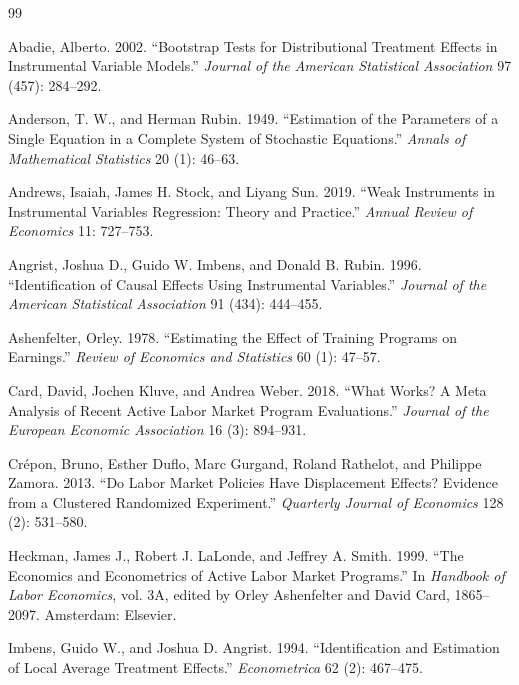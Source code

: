 \documentclass[12pt]{article}
\begin{document}
\begin{thebibliography}{99}

Abadie, Alberto. 2002. ``Bootstrap Tests for Distributional Treatment Effects in Instrumental Variable Models.'' \textit{Journal of the American Statistical Association} 97 (457): 284--292.

Anderson, T. W., and Herman Rubin. 1949. ``Estimation of the Parameters of a Single Equation in a Complete System of Stochastic Equations.'' \textit{Annals of Mathematical Statistics} 20 (1): 46--63.

Andrews, Isaiah, James H. Stock, and Liyang Sun. 2019. ``Weak Instruments in Instrumental Variables Regression: Theory and Practice.'' \textit{Annual Review of Economics} 11: 727--753.

Angrist, Joshua D., Guido W. Imbens, and Donald B. Rubin. 1996. ``Identification of Causal Effects Using Instrumental Variables.'' \textit{Journal of the American Statistical Association} 91 (434): 444--455.

Ashenfelter, Orley. 1978. ``Estimating the Effect of Training Programs on Earnings.'' \textit{Review of Economics and Statistics} 60 (1): 47--57.

Card, David, Jochen Kluve, and Andrea Weber. 2018. ``What Works? A Meta Analysis of Recent Active Labor Market Program Evaluations.'' \textit{Journal of the European Economic Association} 16 (3): 894--931.

Cr\'epon, Bruno, Esther Duflo, Marc Gurgand, Roland Rathelot, and Philippe Zamora. 2013. ``Do Labor Market Policies Have Displacement Effects? Evidence from a Clustered Randomized Experiment.'' \textit{Quarterly Journal of Economics} 128 (2): 531--580.

Heckman, James J., Robert J. LaLonde, and Jeffrey A. Smith. 1999. ``The Economics and Econometrics of Active Labor Market Programs.'' In \textit{Handbook of Labor Economics}, vol. 3A, edited by Orley Ashenfelter and David Card, 1865--2097. Amsterdam: Elsevier.

Imbens, Guido W., and Joshua D. Angrist. 1994. ``Identification and Estimation of Local Average Treatment Effects.'' \textit{Econometrica} 62 (2): 467--475.


\end{thebibliography}
\end{document}
